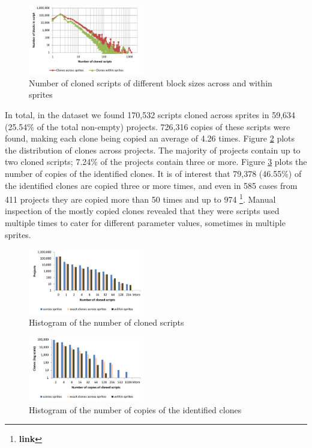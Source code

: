 \documentclass{sig-alternate}
\newcommand{\todo}[1]{\textbf{#1}}
\begin{document}
\begin{figure}
	\centering
	\includegraphics[width=0.45\textwidth]{fig/charts/11cloneslines}
	\caption{Number of cloned scripts of different block sizes across and within sprites}
	\label{fig:cloneslines}
\end{figure}

In total, in the dataset we found 170,532 scripts cloned across sprites in 59,634 (25.54\% of the total non-empty) projects. 726,316 copies of these scripts were found, making each clone being copied an average of 4.26 times. Figure \ref{fig:clonesprojects} plots the distribution of clones across projects. The majority of projects contain up to two cloned scripts; 7.24\% of the projects contain three or more. Figure \ref{fig:clonescopies} plots the number of copies of the identified clones. It is of interest that 79,378 (46.55\%) of the identified clones are copied three or more times, and even in 585 cases from 411 projects they are copied more than 50 times and up to 974 \footnote{\todo{link}}. Manual inspection of the mostly copied clones revealed that they were scripts used multiple times to cater for different parameter values, sometimes in multiple sprites.

\begin{figure}
	\centering
	\includegraphics[width=0.45\textwidth]{fig/charts/11clonesprojects}
	\caption{Histogram of the number of cloned scripts}
	\label{fig:clonesprojects}
\end{figure}

\begin{figure}
	\centering
	\includegraphics[width=0.45\textwidth]{fig/charts/11clonescopies}
	\caption{Histogram of the number of copies of the identified clones}
	\label{fig:clonescopies}
\end{figure}
\end{document}
